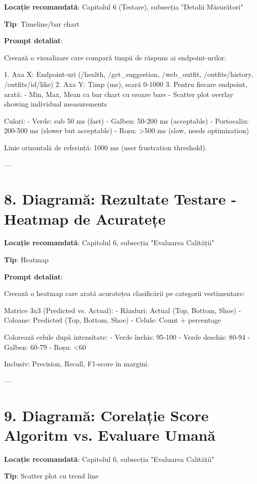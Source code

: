 \textbf{Locație recomandată}: Capitolul 6 (Testare), subsecția "Detalii Măsurători"

\textbf{Tip}: Timeline/bar chart

\textbf{Prompt detaliat}:

Creează o visualizare care compară timpii de răspuns ai endpoint-urilor:

1. Axa X: Endpoint-uri (/health, /get_suggestion, /web_outfit, /outfits/history, /outfits/{id}/like)
2. Axa Y: Timp (ms), scară 0-1000
3. Pentru fiecare endpoint, arată:
   - Min, Max, Mean ca bar chart cu eroare bars
   - Scatter plot overlay showing individual measurements

Culori:
- Verde: sub 50 ms (fast)
- Galben: 50-200 ms (acceptable)
- Portocaliu: 200-500 ms (slower but acceptable)
- Roșu: >500 ms (slow, needs optimization)

Linie orizontală de referință: 1000 ms (user frustration threshold).

---

\section{8. Diagramă: Rezultate Testare - Heatmap de Acuratețe}

\textbf{Locație recomandată}: Capitolul 6, subsecția "Evaluarea Calității"

\textbf{Tip}: Heatmap

\textbf{Prompt detaliat}:

Creează o heatmap care arată acuratețea clasificării pe categorii vestimentare:

Matrice 3x3 (Predicted vs. Actual):
- Rânduri: Actual (Top, Bottom, Shoe)
- Coloane: Predicted (Top, Bottom, Shoe)
- Celule: Count + percentage

Colorează celule după intensitate:
- Verde închis: 95-100%
- Verde deschis: 80-94%
- Galben: 60-79%
- Roșu: <60%

Inclusiv: Precision, Recall, F1-score în margini.

---

\section{9. Diagramă: Corelație Score Algoritm vs. Evaluare Umană}

\textbf{Locație recomandată}: Capitolul 6, subsecția "Evaluarea Calității"

\textbf{Tip}: Scatter plot cu trend line


